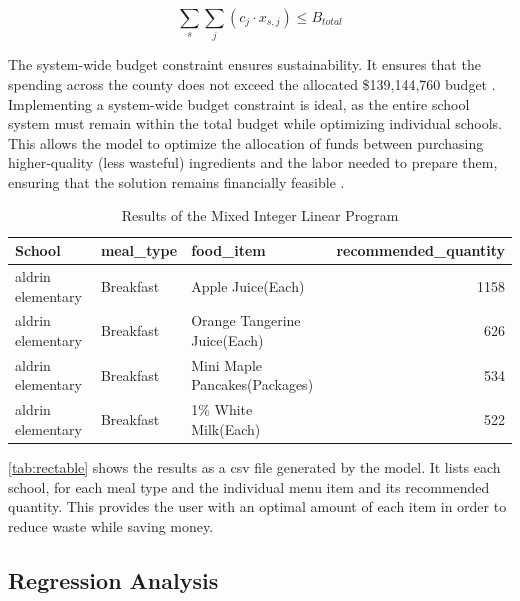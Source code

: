 \documentclass{scrartcl}
\begin{document}
\begin{equation}
    \sum_{s}\sum_{j} (c_{j} \cdot x_{s,j}) \leq B_{total}
    \label{eq:total_budget}
\end{equation}

The system-wide budget constraint ensures sustainability. It ensures that the spending across the county does not exceed the allocated \$139,144,760 budget \cite{fcpsbudget}. Implementing a system-wide budget constraint is ideal, as the entire school system must remain within the total budget while optimizing individual schools. This allows the model to optimize the allocation of funds between purchasing higher-quality (less wasteful) ingredients and the labor needed to prepare them, ensuring that the solution remains financially feasible \cite{cobuloglu}.

\begin{table}[H]
    \centering
    \renewcommand{\arraystretch}{1.5}

    \begin{tabular}{|l|l|l|r|}
    \hline
        \rowcolor{lightgray!50} %
        \textbf{School} & \textbf{meal\_type} & \textbf{food\_item} & \textbf{recommended\_quantity} \\ 
        \hline
        aldrin elementary & Breakfast & Apple Juice(Each) & 1158 \\
        \hline
        aldrin elementary & Breakfast & Orange Tangerine Juice(Each) & 626 \\
        \hline
        aldrin elementary & Breakfast & Mini Maple Pancakes(Packages) & 534 \\
        \hline
        aldrin elementary & Breakfast & 1\% White Milk(Each) & 522 \\
        \hline
    \end{tabular}
    \caption{Results of the Mixed Integer Linear Program}
    \label{tab:rectable}
\end{table}

\autoref{tab:rectable} shows the results as a csv file generated by the model. It lists each school, for each meal type and the individual menu item and its recommended quantity. This provides the user with an optimal amount of each item in order to reduce waste while saving money.

\subsection{Regression Analysis}
\end{document}
